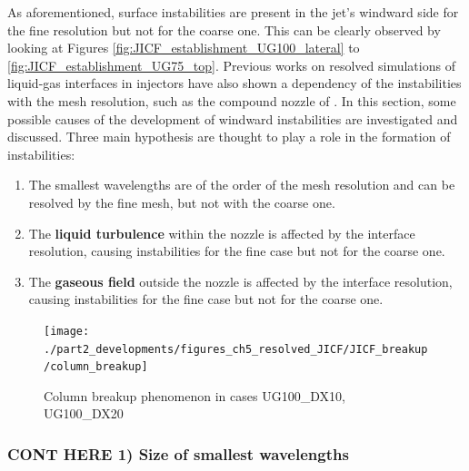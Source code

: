 As aforementioned, surface instabilities are present in the jet's windward side for the fine resolution but not for the coarse one. This can be clearly observed by looking at Figures \ref{fig:JICF_establishment_UG100_lateral} to \ref{fig:JICF_establishment_UG75_top}. Previous works on resolved simulations of liquid-gas interfaces in injectors have also shown a dependency of the instabilities with the mesh resolution, such as the compound nozzle of . In this section, some possible causes of the development of windward instabilities are investigated and discussed. Three main hypothesis are thought to play a role in the formation of instabilities:

\begin{enumerate}

	\item The smallest wavelengths are of the order of the mesh resolution and can be resolved by the fine mesh, but not with the coarse one.
	
	\item The \textbf{liquid turbulence} within the nozzle is affected by the interface resolution, causing instabilities for the fine case but not for the coarse one.
	
	\item The \textbf{gaseous field} outside the nozzle is affected by the interface resolution, causing instabilities for the fine case but not for the coarse one.

\end{enumerate}


\clearpage

\begin{figure}[ht]
\centering
\texttt{[image: ./part2\_developments/figures\_ch5\_resolved\_JICF/JICF\_breakup/column\_breakup]}
\caption{Column breakup phenomenon in cases UG100\_DX10, UG100\_DX20}
\label{fig:jicf_column_breakup_ug100}
\end{figure}


\subsubsection*{CONT HERE 1) Size of smallest wavelengths}


